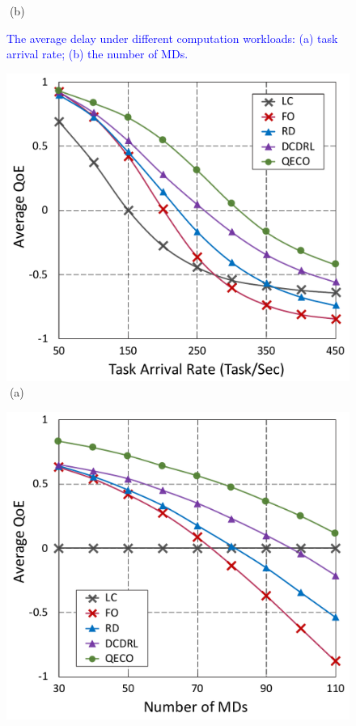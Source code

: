 \documentclass[12pt,draftclsnofoot,onecolumn]{IEEEtran}
\begin{document}
\begin{enumerate}
\begin{figure}[H]
\begin{minipage}[b]{0.33\linewidth}
		\textcolor{white}{i}\hspace{0.6cm}(b)
	\end{minipage}
	
	\caption{\textcolor{blue}{The average delay under different computation workloads: (a) task arrival rate; (b) the number of MDs.}}
	\label{chart3}
\end{figure} \vspace{-12mm}
\begin{figure}[H]\centering
	\captionsetup{name=Fig.}
	\begin{minipage}[b]{0.33\linewidth}
		\centering
		\includegraphics[width=\textwidth]{ qoe_2} 		
		\textcolor{white}{i}\hspace{0.6cm}(a)
	\end{minipage}
	\hspace{-0.2cm}
	\begin{minipage}[b]{0.33\linewidth}
		\centering
		\includegraphics[width=\textwidth]{ qoe_1}

\end{minipage}
\end{figure}
\end{enumerate}
\end{document}
